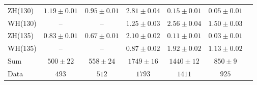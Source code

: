 \documentclass[12pt,twoside,a4paper,cmspaper,final,collab]{cms-tdr}
\begin{document}
\begin{table}[tbp]
\begin{center}
{\begin{tabular}{lcccccc}
ZH(130) & $1.19 \pm 0.01$ & $0.95 \pm 0.01$ & $2.81\pm 0.04$ & $0.15\pm 0.01$ & $0.05\pm 0.01$ \\
WH(130) & -- & -- & $1.25\pm 0.03$ & $2.56\pm 0.04$ & $1.50\pm 0.03$    \\
ZH(135) & $0.83 \pm 0.01$ & $0.67 \pm 0.01$ & $2.10\pm 0.02$ & $0.11\pm 0.01$ & $0.03\pm 0.01$ \\
WH(135) & -- & -- & $0.87\pm 0.02$ & $1.92\pm 0.02$ & $1.13\pm 0.02$    \\
\hline
Sum  &$500 \pm 22$ &$558 \pm 24$ & $1749 \pm 16$ & $1440\pm 12$ & $850\pm 9$ \\\hline
Data &    $ 493 $ & $512$ & $1793$ &  $1411$ & $925$  \\\hline

\end{tabular}
}
\end{center}
\end{table}
\end{document}
